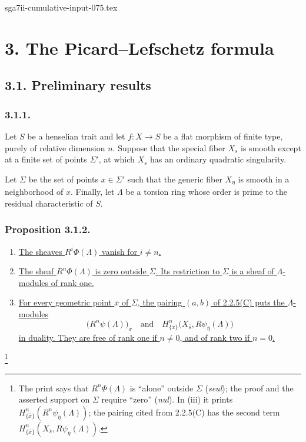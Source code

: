 \begin{filecontents*}{sga7ii-cumulative-input-075.tex}
\section*{3. The Picard--Lefschetz formula}

\subsection*{3.1. Preliminary results}

\subsubsection*{3.1.1.}
Let $S$ be a henselian trait and let $f:X\to S$ be a flat morphism
of finite type, purely of relative dimension $n$.  Suppose that the
special fiber $X_s$ is smooth except at a finite set of points
$\Sigma'$, at which $X_s$ has an ordinary quadratic singularity.

Let $\Sigma$ be the set of points $x\in\Sigma'$ such that the
generic fiber $X_\eta$ is smooth in a neighborhood of $x$.  Finally,
let $\Lambda$ be a torsion ring whose order is prime to the residual
characteristic of $S$.

\subsubsection*{Proposition 3.1.2.}
\begin{enumerate}
\item[(i)] \underline{The sheaves $R^i\Phi(\Lambda)$ vanish for
$i\ne n$.}

\item[(ii)] \underline{The sheaf $R^n\Phi(\Lambda)$ is zero outside
$\Sigma$.  Its restriction to $\Sigma$ is a sheaf of
$\Lambda$-modules of rank one.}

\item[(iii)] \underline{For every geometric point $\bar x$ of
$\Sigma$, the pairing $(a,b)$ of 2.2.5(C) puts the $\Lambda$-modules}
\[
\bigl(R^n\psi(\Lambda)\bigr)_{\bar x}
\quad\text{and}\quad
H^n_{\{\bar x\}}\bigl(X_{\bar s},R\psi_{\bar\eta}(\Lambda)\bigr)
\]
\underline{in duality.  They are free of rank one if $n\ne0$, and
of rank two if $n=0$.}
\end{enumerate}
\footnote{The print says that $R^n\Phi(\Lambda)$ is ``alone''
outside $\Sigma$ (\emph{seul}); the proof and the asserted support on
$\Sigma$ require ``zero'' (\emph{nul}).  In (iii) it prints
$H^n_{\{\bar x\}}(R^n\psi_{\bar\eta}(\Lambda))$; the pairing cited
from 2.2.5(C) has the second term
$H^n_{\{\bar x\}}(X_{\bar s},R\psi_{\bar\eta}(\Lambda))$.}


\end{filecontents*}
